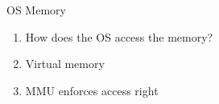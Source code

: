 \documentclass{beamer}
\begin{document}
\begin{frame}{OS Memory}
  \begin{enumerate}
  \item<1-> How does the OS access the memory?
  \item<2-> Virtual memory
  \item<7-> MMU enforces access right
\end{enumerate}
\begin{center}
\end{center}
\end{frame}
\end{document}
